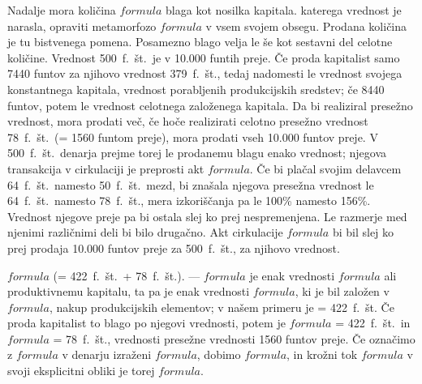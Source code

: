 \documentclass[kapital_02.tex]{subfiles}
\begin{document}
Nadalje mora količina \( formula \) blaga kot nosilka kapitala. katerega vrednost je narasla, opraviti metamorfozo \( formula \) v vsem svojem obsegu. Prodana količina je tu bistvenega pomena. Posamezno blago velja le še kot sestavni del celotne količine. Vrednost 500~f.~št.\ je v 10.000 funtih preje. Če proda kapitalist samo 7440 funtov za njihovo vrednost 379~f.~št., tedaj nadomesti le vrednost svojega konstantnega kapitala, vrednost porabljenih produkcijskih sredstev; če 8440 funtov, potem le vrednost celotnega založenega kapitala. Da bi realiziral presežno vrednost, mora prodati več, če hoče realizirati celotno presežno vrednost 78~f.~št.\ (= 1560 funtom preje), mora prodati vseh 10.000 funtov preje. V 500~f.~št.\ denarja prejme torej le prodanemu blagu enako vrednost; njegova transakcija v cirkulaciji je preprosti akt \( formula \). Če bi plačal svojim delavcem 64~f.~št.\ namesto 50~f.~št.\ mezd, bi znašala njegova presežna vrednost le 64~f.~št.\ namesto 78~f.~št., mera izkoriščanja pa le 100\% namesto 156\%. Vrednost njegove preje pa bi ostala slej ko prej nespremenjena. Le razmerje med njenimi različnimi deli bi bilo drugačno. Akt cirkulacije \( formula \) bi bil slej ko prej prodaja 10.000 funtov preje za 500~f.~št., za njihovo vrednost.

\( formula \) (= 422~f.~št.\ + 78~f.~št.). --- \( formula \) je enak vrednosti \( formula \) ali produktivnemu kapitalu, ta pa je enak vrednosti \( formula \), ki je bil založen v \( formula \), nakup produkcijskih elementov; v našem primeru je = 422~f.~št. Če proda kapitalist to blago po njegovi vrednosti, potem je \( formula \) = 422~f.~št.\ in \( formula \) = 78~f.~št., vrednosti presežne vrednosti 1560 funtov preje. Če označimo z \( formula \) v denarju izraženi \( formula \), dobimo \( formula \), in krožni tok \( formula \) v svoji eksplicitni obliki je torej \( formula \).
\end{document}
